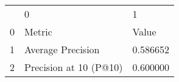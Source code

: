 \begin{tabular}{lll}
 & 0 & 1 \\
0 & Metric & Value \\
1 & Average Precision & 0.586652 \\
2 & Precision at 10 (P@10) & 0.600000 \\
\end{tabular}
